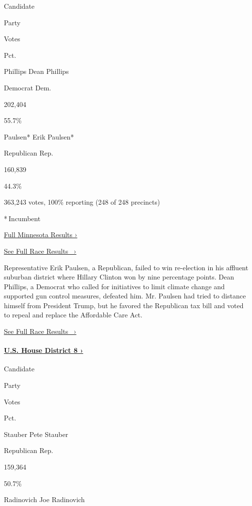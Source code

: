 Candidate

Party

Votes

Pct.

 Phillips Dean Phillips

Democrat Dem.

202,404

55.7\%

 Paulsen* Erik Paulsen*

Republican Rep.

160,839

44.3\%

363,243 votes, 100\% reporting (248 of 248 precincts)

* Incumbent

\href{https://www.nytimes3xbfgragh.onion/interactive/2018/11/06/us/elections/results-minnesota-elections.html}{Full
Minnesota Results ›}

\href{https://www.nytimes3xbfgragh.onion/elections/results/minnesota-house-district-3}{See
Full Race Results~ ›}

Representative Erik Paulsen, a Republican, failed to win re-election in
his affluent suburban district where Hillary Clinton won by nine
percentage points. Dean Phillips, a Democrat who called for initiatives
to limit climate change and supported gun control measures, defeated
him. Mr. Paulsen had tried to distance himself from President Trump, but
he favored the Republican tax bill and voted to repeal and replace the
Affordable Care Act.

\href{https://www.nytimes3xbfgragh.onion/elections/results/minnesota-house-district-3}{See
Full Race Results~ ›}

\hypertarget{us-house-district-8-}{%
\paragraph{\texorpdfstring{\href{https://www.nytimes3xbfgragh.onion/elections/results/minnesota-house-district-8}{U.S.
House District 8
›}}{U.S. House District 8 ›}}\label{us-house-district-8-}}

Candidate

Party

Votes

Pct.

 Stauber Pete Stauber

Republican Rep.

159,364

50.7\%

 Radinovich Joe Radinovich

